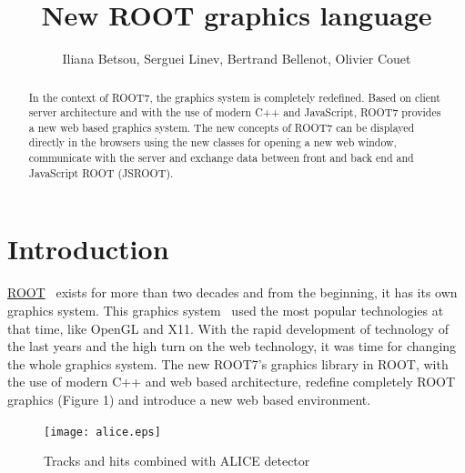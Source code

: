 \documentclass[a4paper]{jpconf}
\begin{document}
\title{New ROOT graphics language}

\author{Iliana Betsou, Serguei Linev, Bertrand Bellenot, Olivier Couet}

\address{Production Editor, \jpcs, \iopp, Dirac House, Temple Back, Bristol BS1~6BE, UK}


\begin{abstract}
In the context of ROOT7, the graphics system is completely redefined. Based on client
server architecture and with the use of modern C++ and JavaScript, ROOT7 provides a
new web based graphics system. The new concepts of ROOT7 can be displayed directly
in the browsers using the new classes for opening a new web window, communicate
with the server and exchange data between front and back end and JavaScript ROOT (JSROOT).
\end{abstract}

\section{Introduction}
\href{https://root.cern.ch/}{ROOT}~\cite{root} exists for more than two decades and
from the beginning, it has its own graphics system. This graphics system~\cite{Antcheva:2011zz}
used the most popular technologies at that time, like OpenGL and X11. With the rapid development
of technology of the last years and the high turn on the web technology, it was time for
changing the whole graphics system. The new ROOT7's graphics library in ROOT, with the
use of modern C++ and web based architecture, redefine completely ROOT graphics (Figure 1)
 and introduce a new web based environment.
\\
\begin{figure}[h]
  \begin{center}
    \texttt{[image: alice.eps]}\hspace{2pc}%
  \end{center}
\centering
\begin{minipage}[b]{25pc}\caption{\label{label}Tracks and hits combined with ALICE detector}
\end{minipage}
\end{figure}
\end{document}
